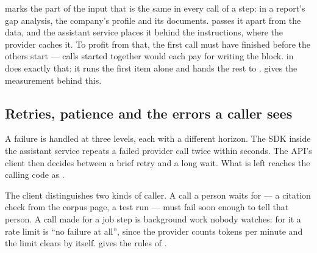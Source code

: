  marks the part of the input that is the same in every call of a step: in a
report's gap analysis, the company's profile and its documents.  passes it
apart from the data, and the assistant service places it behind the instructions, where the
provider caches it. To profit from that, the first call must have finished before the others
start --- calls started together would each pay for writing the block. 
in  does exactly that: it runs the first item alone and hands the
rest to .  gives the measurement behind this.

\subsection{Retries, patience and the errors a caller sees}\label{sec:models:errors}

A failure is handled at three levels, each with a different horizon. The SDK inside the
assistant service repeats a failed provider call twice within seconds. The API's client then
decides between a brief retry and a long wait. What is left reaches the calling code as
.

The client distinguishes two kinds of caller. A call a person waits for --- a citation check
from the corpus page, a test run --- must fail soon enough to tell that person. A call made for
a job step is background work nobody watches: for it a rate limit is \enquote{no failure at
all}, since the provider counts tokens per minute and the limit clears by itself.
 gives the rules of .

